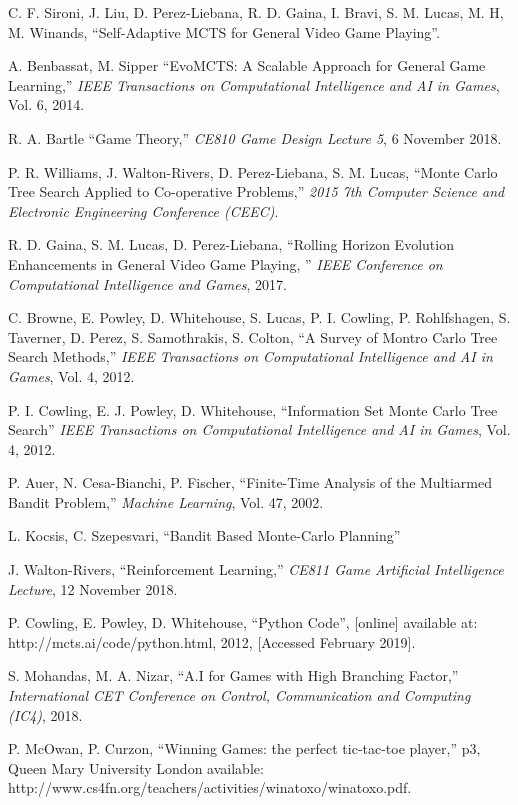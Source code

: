 \documentclass[conference]{IEEEtran}
\begin{document}
\begin{thebibliography}{9}

C. F. Sironi, J. Liu, D. Perez-Liebana, R. D. Gaina, I. Bravi, S. M. Lucas, M. H, M. Winands, ``Self-Adaptive MCTS for General Video Game Playing''. 

A. Benbassat, M. Sipper
``EvoMCTS: A Scalable Approach for General Game Learning,'' 
{\em IEEE Transactions on Computational Intelligence and AI in Games}, Vol. 6, 2014.

R. A. Bartle ``Game Theory,'' {\em CE810 Game Design Lecture 5}, 6 November 2018. 

P. R. Williams, J. Walton-Rivers, D. Perez-Liebana, S. M. Lucas, ``Monte Carlo Tree Search Applied to Co-operative Problems,'' {\em 2015 7th Computer Science and Electronic Engineering Conference (CEEC)}.

R. D. Gaina, S. M. Lucas, D. Perez-Liebana, ``Rolling Horizon Evolution Enhancements in General Video Game Playing, '' {\em IEEE Conference on Computational Intelligence and Games}, 2017.

C. Browne, E. Powley, D. Whitehouse, S. Lucas, P. I. Cowling, P. Rohlfshagen, S. Taverner, D. Perez, S. Samothrakis, S. Colton,  
``A Survey of Montro Carlo Tree Search Methods,'' 
{\em IEEE Transactions on Computational Intelligence and AI in Games}, Vol. 4, 2012.

P. I. Cowling, E. J. Powley, D. Whitehouse, 
``Information Set Monte Carlo Tree Search'' 
{\em IEEE Transactions on Computational Intelligence and AI in Games}, Vol. 4, 2012.

P. Auer, N. Cesa-Bianchi, P. Fischer, ``Finite-Time Analysis of the Multiarmed Bandit Problem,'' {\em Machine Learning}, Vol. 47, 2002.

L. Kocsis, C. Szepesvari, ``Bandit Based Monte-Carlo Planning'' 

J. Walton-Rivers, ``Reinforcement Learning,'' {\em CE811 Game Artificial Intelligence Lecture}, 12 November 2018. 

P. Cowling, E. Powley, D. Whitehouse, ``Python Code'', [online] available at: http://mcts.ai/code/python.html, 2012, [Accessed February 2019].

S. Mohandas, M. A. Nizar, ``A.I for Games with High Branching Factor,'' {\em International CET Conference on Control, Communication and Computing (IC4)}, 2018.

P. McOwan, P. Curzon, ``Winning Games: the perfect tic-tac-toe player,'' p3, Queen Mary University London available: http://www.cs4fn.org/teachers/activities/winatoxo/winatoxo.pdf. 

\end{thebibliography}
\end{document}
